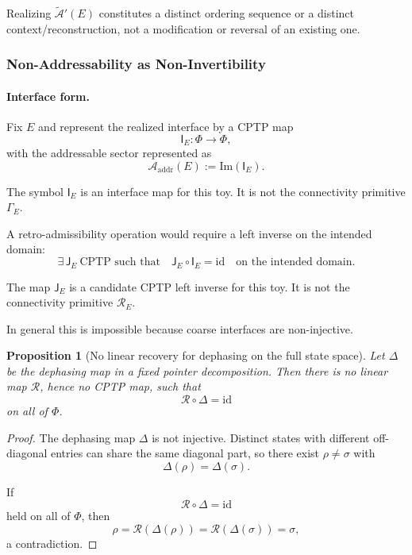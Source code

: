\documentclass[aps,prx,onecolumn,11pt]{revtex4-2}
\theoremstyle{plain}
\newtheorem{proposition}{Proposition}
\theoremstyle{definition}
\theoremstyle{remark}
\begin{document}
Realizing \(\widetilde{\mathcal A}'(E)\) constitutes a distinct
ordering sequence or a distinct context/reconstruction, not a
modification or reversal of an existing one.

\subsubsection{Non-Addressability as Non-Invertibility}
\label{toy:finite_dim:noninvertibility_obstruction}

\paragraph{Interface form.}

Fix \(E\) and represent the realized interface by a CPTP map
\[
\mathsf I_E:\Phi\to\Phi,
\]
with the addressable sector represented as
\[
\mathcal A_{\mathrm{addr}}(E):=\mathrm{Im}(\mathsf I_E).
\]

The symbol \(\mathsf I_E\) is an interface map for this toy. It is not
the connectivity primitive \(\Gamma_E\).

A retro-admissibility operation would require a left inverse on the
intended domain:
\[
\exists\,\mathsf J_E\ \text{CPTP such that}\quad
\mathsf J_E\circ\mathsf I_E=\mathrm{id}
\quad
\text{on the intended domain}.
\]

The map \(\mathsf J_E\) is a candidate CPTP left inverse for this toy.
It is not the connectivity primitive \(\mathcal R_E\).

In general this is impossible because coarse interfaces are
non-injective.

\begin{proposition}[No linear recovery for dephasing on the full state space]
\label{prop:no_cptp_recovery}
Let \(\Delta\) be the dephasing map in a fixed pointer decomposition.
Then there is no linear map \(\mathcal R\), hence no CPTP map, such that
\[
\mathcal R\circ\Delta=\mathrm{id}
\]
on all of \(\Phi\).
\end{proposition}

\begin{proof}
The dephasing map \(\Delta\) is not injective. Distinct states with
different off-diagonal entries can share the same diagonal part, so
there exist \(\rho\neq\sigma\) with
\[
\Delta(\rho)=\Delta(\sigma).
\]

If
\[
\mathcal R\circ\Delta=\mathrm{id}
\]
held on all of \(\Phi\), then
\[
\rho
=
\mathcal R(\Delta(\rho))
=
\mathcal R(\Delta(\sigma))
=
\sigma,
\]
a contradiction.
\end{proof}
\end{document}
